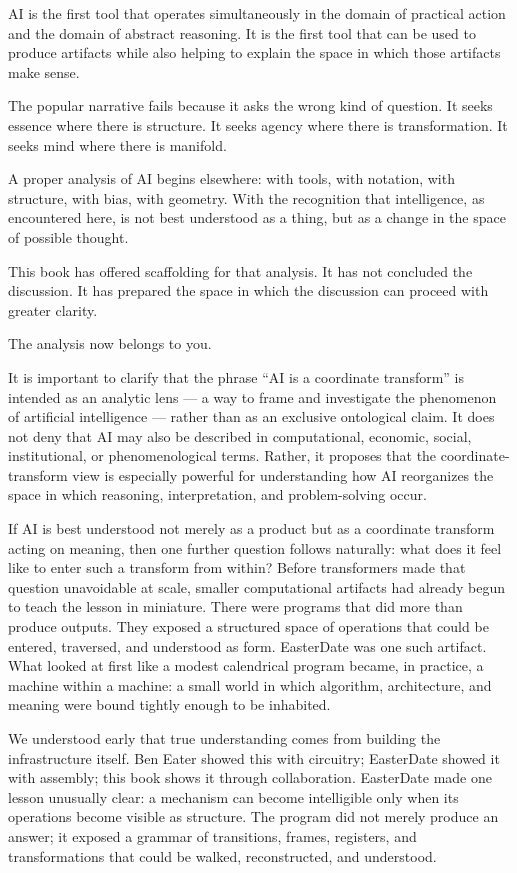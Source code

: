 AI is the first tool that operates simultaneously in the domain of
practical action and the domain of abstract reasoning. It is the first
tool that can be used to produce artifacts while also helping to explain
the space in which those artifacts make sense.

The popular narrative fails because it asks the wrong kind of question.
It seeks essence where there is structure. It seeks agency where there
is transformation. It seeks mind where there is manifold.

A proper analysis of AI begins elsewhere: with tools, with notation,
with structure, with bias, with geometry. With the recognition that
intelligence, as encountered here, is not best understood as a thing,
but as a change in the space of possible thought.

This book has offered scaffolding for that analysis. It has not
concluded the discussion. It has prepared the space in which the
discussion can proceed with greater clarity.

The analysis now belongs to you.

It is important to clarify that the phrase ``AI is a coordinate
transform'' is intended as an analytic lens --- a way to frame and
investigate the phenomenon of artificial intelligence --- rather than as
an exclusive ontological claim. It does not deny that AI may also be
described in computational, economic, social, institutional, or
phenomenological terms. Rather, it proposes that the
coordinate-transform view is especially powerful for understanding how
AI reorganizes the space in which reasoning, interpretation, and
problem-solving occur.

If AI is best understood not merely as a product but as a coordinate
transform acting on meaning, then one further question follows
naturally: what does it feel like to enter such a transform from within?
Before transformers made that question unavoidable at scale, smaller
computational artifacts had already begun to teach the lesson in
miniature. There were programs that did more than produce outputs. They
exposed a structured space of operations that could be entered,
traversed, and understood as form. EasterDate was one such artifact.
What looked at first like a modest calendrical program became, in
practice, a machine within a machine: a small world in which algorithm,
architecture, and meaning were bound tightly enough to be inhabited.

We understood early that true understanding comes from building the
infrastructure itself. Ben Eater showed this with circuitry; EasterDate
showed it with assembly; this book shows it through collaboration.
EasterDate made one lesson unusually clear: a mechanism can become
intelligible only when its operations become visible as structure. The
program did not merely produce an answer; it exposed a grammar of
transitions, frames, registers, and transformations that could be
walked, reconstructed, and understood.

